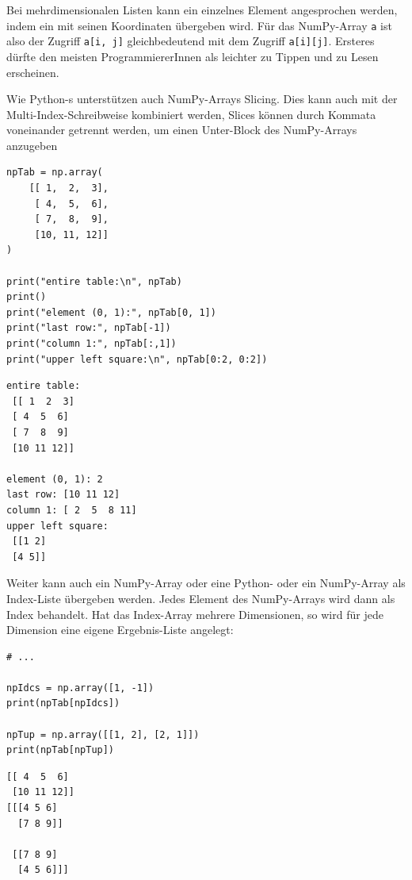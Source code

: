 Bei mehrdimensionalen Listen kann ein einzelnes Element angesprochen werden, indem ein  mit seinen Koordinaten übergeben wird. Für das NumPy-Array \texttt{a} ist also der Zugriff \texttt{a[i, j]} gleichbedeutend mit dem Zugriff \texttt{a[i][j]}. Ersteres dürfte den meisten ProgrammiererInnen als leichter zu Tippen und zu Lesen erscheinen.

Wie Python-s unterstützen auch NumPy-Arrays Slicing. Dies kann auch mit der Multi-Index-Schreibweise kombiniert werden, \ie Slices können durch Kommata voneinander getrennt werden, um einen Unter-Block des NumPy-Arrays anzugeben
\begin{codebox}
\begin{verbatim}
npTab = np.array(
    [[ 1,  2,  3],
     [ 4,  5,  6],
     [ 7,  8,  9],
     [10, 11, 12]]
)

print("entire table:\n", npTab)
print()
print("element (0, 1):", npTab[0, 1])
print("last row:", npTab[-1])
print("column 1:", npTab[:,1])
print("upper left square:\n", npTab[0:2, 0:2])
\end{verbatim}
\end{codebox}

\begin{cmdbox}
\begin{verbatim}
entire table:
 [[ 1  2  3]
 [ 4  5  6]
 [ 7  8  9]
 [10 11 12]]

element (0, 1): 2
last row: [10 11 12]
column 1: [ 2  5  8 11]
upper left square:
 [[1 2]
 [4 5]]
\end{verbatim}
\end{cmdbox}

Weiter kann auch ein NumPy-Array oder eine Python- oder ein NumPy-Array als Index-Liste übergeben werden. Jedes Element des NumPy-Arrays wird dann als Index behandelt. Hat das Index-Array mehrere Dimensionen, so wird für jede Dimension eine eigene Ergebnis-Liste angelegt:

\begin{tcbraster}[raster columns=2,
                  raster equal height,
                  nobeforeafter,
                  raster column skip=0.5cm]
\begin{codebox}
\begin{verbatim}
# ...

npIdcs = np.array([1, -1])
print(npTab[npIdcs])

npTup = np.array([[1, 2], [2, 1]])
print(npTab[npTup])
\end{verbatim}
\end{codebox}
%
\begin{cmdbox}
\begin{verbatim}
[[ 4  5  6]
 [10 11 12]]
[[[4 5 6]
  [7 8 9]]

 [[7 8 9]
  [4 5 6]]]
\end{verbatim}
\end{cmdbox}
\end{tcbraster}

